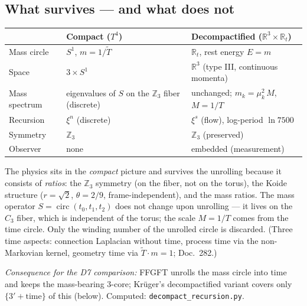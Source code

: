 \subsection{What survives --- and what does not}
\begin{center}
\begin{tabular}{@{}p{3.1cm} p{4.4cm} p{4.9cm}@{}}
\toprule
 & Compact ($T^4$) & Decompactified ($\mathbb{R}^3\times\mathbb{R}_t$) \\
\midrule
Mass circle & $S^1$, $m=1/\tilde{T}$ & $\mathbb{R}_t$, rest energy $E=m$ \\
Space & $3\times S^1$ & $\mathbb{R}^3$ (type III, continuous momenta) \\
Mass spectrum & eigenvalues of $S$ on the $\mathbb{Z}_3$ fiber (discrete) & unchanged; $m_k=\mu_k^2\,M$, $M=1/T$ \\
Recursion & $\xi^n$ (discrete) & $\xi^s$ (flow), log-period $\ln 7500$ \\
Symmetry & $\mathbb{Z}_3$ & $\mathbb{Z}_3$ (preserved) \\
Observer & none & embedded (measurement) \\
\bottomrule
\end{tabular}
\end{center}

The physics sits in the \emph{compact} picture and survives the unrolling because it consists of
\emph{ratios}: the $\mathbb{Z}_3$ symmetry (on the fiber, not on the torus), the Koide structure
($r=\sqrt2$, $\theta=2/9$, frame-independent), and the mass ratios. The mass operator
$S=\operatorname{circ}(t_0,t_1,t_2)$ does not change upon unrolling --- it lives on the $C_3$ fiber,
which is independent of the torus; the scale $M=1/T$ comes from the time circle. Only the winding
number of the unrolled circle is discarded. (Three time aspects: connection Laplacian without time,
process time via the non-Markovian kernel, geometry time via $\tilde{T}\cdot m=1$; Doc.~282.)

\emph{Consequence for the D7 comparison:} FFGFT unrolls the mass circle into time and keeps the
mass-bearing $3$-core; Kr\"uger's decompactified variant covers only $\{3'+\text{time}\}$ of this
(below). Computed: \texttt{decompact\_recursion.py}.

